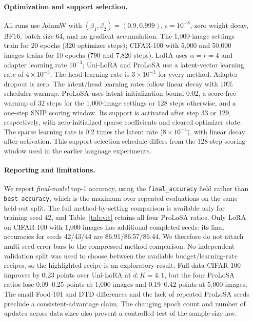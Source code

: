 \paragraph{Optimization and support selection.}
All runs use AdamW with $(\beta_1,\beta_2)=(0.9,0.999)$, $\epsilon=10^{-8}$, zero weight decay, BF16, batch size 64, and no gradient accumulation. The 1,000-image settings train for 20 epochs (320 optimizer steps); CIFAR-100 with 5,000 and 50,000 images trains for 10 epochs (790 and 7,820 steps). LoRA uses $\alpha=r=4$ and adapter learning rate $10^{-3}$; Uni-LoRA and ProLoSA use a latent-vector learning rate of $4\times10^{-3}$. The head learning rate is $3\times10^{-3}$ for every method. Adapter dropout is zero. The latent/head learning rates follow linear decay with 10\% scheduler warmup. ProLoSA uses latent initialization bound 0.02, a score-free warmup of 32 steps for the 1,000-image settings or 128 steps otherwise, and a one-step SNIP scoring window. Its support is activated after step 33 or 129, respectively, with zero-initialized sparse coefficients and cleared optimizer state. The sparse learning rate is $0.2$ times the latent rate ($8\times10^{-4}$), with linear decay after activation. This support-selection schedule differs from the 128-step scoring window used in the earlier language experiments.

\paragraph{Reporting and limitations.}
We report \emph{final-model} top-1 accuracy, using the \texttt{final\_accuracy} field rather than \texttt{best\_accuracy}, which is the maximum over repeated evaluations on the same held-out split. The full method-by-setting comparison is available only for training seed 42, and Table~\ref{tab:vit} retains all four ProLoSA ratios. Only LoRA on CIFAR-100 with 1,000 images has additional completed seeds: its final accuracies for seeds 42/43/44 are 86.91/86.57/86.44. We therefore do not attach multi-seed error bars to the compressed-method comparison. No independent validation split was used to choose between the available budget/learning-rate recipes, so the highlighted recipe is an exploratory result. Full-data CIFAR-100 improves by 0.23 points over Uni-LoRA at $d:K=4:1$, but the four ProLoSA ratios lose 0.09--0.25 points at 1,000 images and 0.19--0.42 points at 5,000 images. The small Food-101 and DTD differences and the lack of repeated ProLoSA seeds preclude a consistent-advantage claim. The changing epoch count and number of updates across data sizes also prevent a controlled test of the sample-size law.

